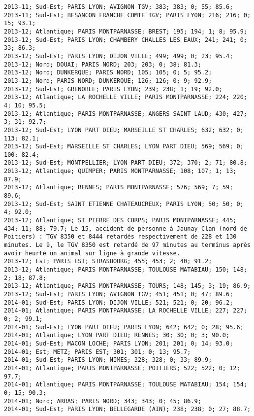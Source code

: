 \documentclass{article}
\begin{document}
\begin{Verbatim}[commandchars=\\\{\}]
2013-11; Sud-Est; PARIS LYON; AVIGNON TGV; 383; 383; 0; 55; 85.6; 
2013-11; Sud-Est; BESANCON FRANCHE COMTE TGV; PARIS LYON; 216; 216; 0; 15; 93.1; 
2013-12; Atlantique; PARIS MONTPARNASSE; BREST; 195; 194; 1; 8; 95.9; 
2013-12; Sud-Est; PARIS LYON; CHAMBERY CHALLES LES EAUX; 241; 241; 0; 33; 86.3; 
2013-12; Sud-Est; PARIS LYON; DIJON VILLE; 499; 499; 0; 23; 95.4; 
2013-12; Nord; DOUAI; PARIS NORD; 203; 203; 0; 38; 81.3; 
2013-12; Nord; DUNKERQUE; PARIS NORD; 105; 105; 0; 5; 95.2; 
2013-12; Nord; PARIS NORD; DUNKERQUE; 126; 126; 0; 9; 92.9; 
2013-12; Sud-Est; GRENOBLE; PARIS LYON; 239; 238; 1; 19; 92.0; 
2013-12; Atlantique; LA ROCHELLE VILLE; PARIS MONTPARNASSE; 224; 220; 4; 10; 95.5; 
2013-12; Atlantique; PARIS MONTPARNASSE; ANGERS SAINT LAUD; 430; 427; 3; 31; 92.7; 
2013-12; Sud-Est; LYON PART DIEU; MARSEILLE ST CHARLES; 632; 632; 0; 113; 82.1; 
2013-12; Sud-Est; MARSEILLE ST CHARLES; LYON PART DIEU; 569; 569; 0; 100; 82.4; 
2013-12; Sud-Est; MONTPELLIER; LYON PART DIEU; 372; 370; 2; 71; 80.8; 
2013-12; Atlantique; QUIMPER; PARIS MONTPARNASSE; 108; 107; 1; 13; 87.9; 
2013-12; Atlantique; RENNES; PARIS MONTPARNASSE; 576; 569; 7; 59; 89.6; 
2013-12; Sud-Est; SAINT ETIENNE CHATEAUCREUX; PARIS LYON; 50; 50; 0; 4; 92.0; 
2013-12; Atlantique; ST PIERRE DES CORPS; PARIS MONTPARNASSE; 445; 434; 11; 88; 79.7; Le 15, accident de personne à Jaunay-Clan (nord de Poitiers) : TGV 8350 et 8444 retardés respectivement de 228 et 130 minutes. Le 9, le TGV 8350 est retardé de 97 minutes au terminus après avoir heurté un animal sur ligne à grande vitesse.
2013-12; Est; PARIS EST; STRASBOURG; 455; 453; 2; 40; 91.2; 
2013-12; Atlantique; PARIS MONTPARNASSE; TOULOUSE MATABIAU; 150; 148; 2; 18; 87.8; 
2013-12; Atlantique; PARIS MONTPARNASSE; TOURS; 148; 145; 3; 19; 86.9; 
2013-12; Sud-Est; PARIS LYON; AVIGNON TGV; 451; 451; 0; 47; 89.6; 
2014-01; Sud-Est; PARIS LYON; DIJON VILLE; 521; 521; 0; 20; 96.2; 
2014-01; Atlantique; PARIS MONTPARNASSE; LA ROCHELLE VILLE; 227; 227; 0; 2; 99.1; 
2014-01; Sud-Est; LYON PART DIEU; PARIS LYON; 642; 642; 0; 28; 95.6; 
2014-01; Atlantique; LYON PART DIEU; RENNES; 30; 30; 0; 3; 90.0; 
2014-01; Sud-Est; MACON LOCHE; PARIS LYON; 201; 201; 0; 14; 93.0; 
2014-01; Est; METZ; PARIS EST; 301; 301; 0; 13; 95.7; 
2014-01; Sud-Est; PARIS LYON; NIMES; 328; 328; 0; 33; 89.9; 
2014-01; Atlantique; PARIS MONTPARNASSE; POITIERS; 522; 522; 0; 12; 97.7; 
2014-01; Atlantique; PARIS MONTPARNASSE; TOULOUSE MATABIAU; 154; 154; 0; 15; 90.3; 
2014-01; Nord; ARRAS; PARIS NORD; 343; 343; 0; 45; 86.9; 
2014-01; Sud-Est; PARIS LYON; BELLEGARDE (AIN); 238; 238; 0; 27; 88.7; 

\end{Verbatim}
\end{document}
